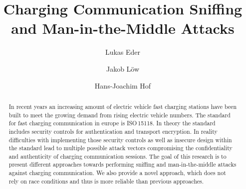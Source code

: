 \documentclass[sigconf]{acmart}
\begin{document}
\title{Charging Communication Sniffing and Man-in-the-Middle Attacks}

\author{Lukas Eder}
\author{Jakob Löw}
\authornotemark[1]

\author{Hans-Joachim Hof}

\renewcommand{\shortauthors}{Eder and Loew et al.}

\begin{abstract}
In recent years an increasing amount of electric vehicle fast charging stations have been built to meet the growing demand from rising electric vehicle numbers.
The standard for fast charging communication in europe is ISO\,15118.
In theory the standard includes security controls for authentication and transport encryption.
In reality difficulties with implementing those security controls as well as insecure design within the standard lead to multiple possible attack vectors compromising the confidentiality and authenticity of charging communication sessions.
The goal of this research is to present different approaches towards performing sniffing and man-in-the-middle attacks against charging communication.
We also provide a novel approach, which does not rely on race conditions and thus is more reliable than previous approaches.
\end{abstract}
\end{document}
